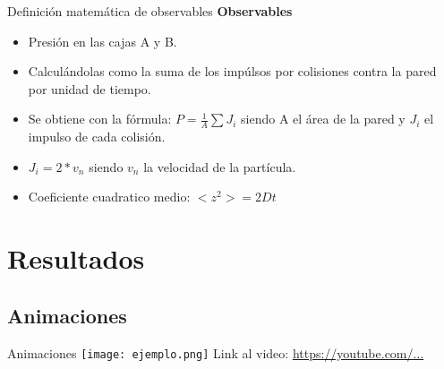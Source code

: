 \documentclass{beamer}
\begin{document}
\begin{frame}{Definición matemática de observables}
  \textbf{Observables}
  \begin{itemize}
    \item Presión en las cajas A y B.
    \item Calculándolas como la suma de los impúlsos por colisiones contra la pared por unidad de tiempo.
    \item Se obtiene con la fórmula: $P = \frac{1}{A} \sum J_i$ siendo A el área de la pared y $J_i$ el impulso de cada colisión.
    \item $J_i = 2 * v_n$ siendo $v_n$ la velocidad de la partícula.
    \item Coeficiente cuadratico medio: $<z^2> = 2Dt$
  \end{itemize}
\end{frame}

\section{Resultados}
\subsection{Animaciones}
\begin{frame}{Animaciones}
  \texttt{[image: ejemplo.png]}
  \vspace{0.3cm}
  \footnotesize Link al video: \url{https://youtube.com/...}
\end{frame}
\end{document}
